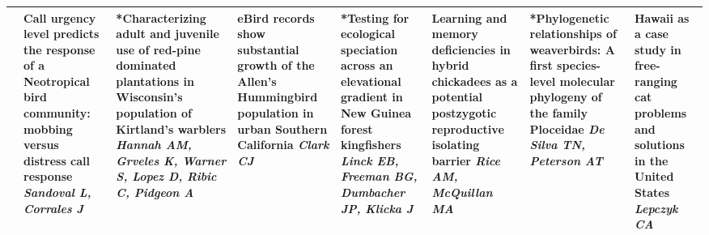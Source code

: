 \begin{tabular}{|x{0.85cm}|x{2.85cm}|x{2.85cm}|x{2.85cm}|x{2.85cm}|a{2.85cm}|x{2.85cm}|a{2.85cm}|}
&Call urgency level predicts the response of a Neotropical bird community: mobbing versus distress call response \newline \newline \textit{Sandoval L, Corrales J} & *Characterizing adult and juvenile use of red-pine dominated plantations in Wisconsin's population of Kirtland's warblers \newline \newline \textit{Hannah AM, Grveles K, Warner S, Lopez D, Ribic C, Pidgeon A} & eBird records show substantial growth of the Allen's Hummingbird population in urban Southern California \newline \newline \textit{Clark CJ} & *Testing for ecological speciation across an elevational gradient in New Guinea forest kingfishers \newline \newline \textit{Linck EB, Freeman BG, Dumbacher JP, Klicka J} & Learning and memory deficiencies in hybrid chickadees as a potential postzygotic reproductive isolating barrier \newline \newline \textit{Rice AM, McQuillan MA} & *Phylogenetic relationships of weaverbirds: A first species-level molecular phylogeny of the family Ploceidae \newline \newline \textit{De Silva TN, Peterson AT} & Hawaii as a case study in free-ranging cat problems and solutions in the United States \newline \newline \textit{Lepczyk CA}\\
\hline

\end{tabular}
